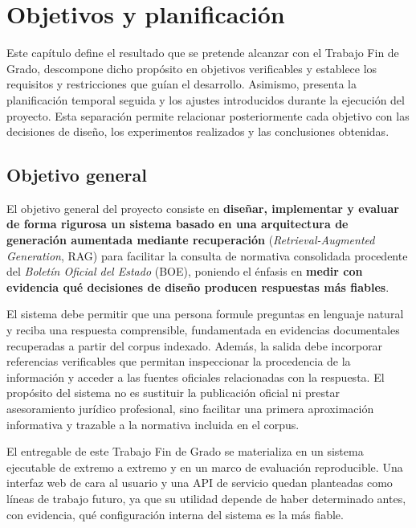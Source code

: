 
\chapter{Objetivos y planificación}
\label{chap:objetivos}

Este capítulo define el resultado que se pretende alcanzar con el Trabajo Fin de Grado, descompone dicho propósito en objetivos verificables y establece los requisitos y restricciones que guían el desarrollo. Asimismo, presenta la planificación temporal seguida y los ajustes introducidos durante la ejecución del proyecto. Esta separación permite relacionar posteriormente cada objetivo con las decisiones de diseño, los experimentos realizados y las conclusiones obtenidas.

\section{Objetivo general}
\label{sec:objetivo-general}

El objetivo general del proyecto consiste en \textbf{diseñar, implementar y evaluar de forma rigurosa un sistema basado en una arquitectura de generación aumentada mediante recuperación} (\emph{Retrieval-Augmented Generation}, RAG) para facilitar la consulta de normativa consolidada procedente del \emph{Boletín Oficial del Estado} (BOE), poniendo el énfasis en \textbf{medir con evidencia qué decisiones de diseño producen respuestas más fiables}.

El sistema debe permitir que una persona formule preguntas en lenguaje natural y reciba una respuesta comprensible, fundamentada en evidencias documentales recuperadas a partir del corpus indexado. Además, la salida debe incorporar referencias verificables que permitan inspeccionar la procedencia de la información y acceder a las fuentes oficiales relacionadas con la respuesta. El propósito del sistema no es sustituir la publicación oficial ni prestar asesoramiento jurídico profesional, sino facilitar una primera aproximación informativa y trazable a la normativa incluida en el corpus.

El entregable de este Trabajo Fin de Grado se materializa en un sistema ejecutable de extremo a extremo y en un marco de evaluación reproducible. Una interfaz web de cara al usuario y una API de servicio quedan planteadas como líneas de trabajo futuro, ya que su utilidad depende de haber determinado antes, con evidencia, qué configuración interna del sistema es la más fiable.

